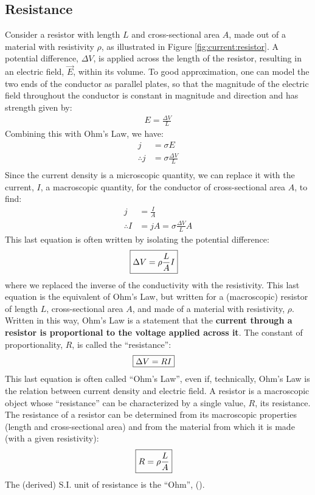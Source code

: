 \subsection{Resistance}
Consider a resistor with length $L$ and cross-sectional area $A$, made out of a material with resistivity $\rho$, as illustrated in Figure \ref{fig:current:resistor}.
A potential difference, $\Delta V$, is applied across the length of the resistor, resulting in an electric field, $\vec E$, within its volume. To good approximation, one can model the two ends of the conductor as parallel plates, so that the magnitude of the electric field throughout the conductor is constant in magnitude and direction and has strength given by:
\begin{align*}
E=\frac{\Delta V}{L}
\end{align*}
Combining this with Ohm's Law, we have:
\begin{align*}
j&=\sigma E\\
\therefore j&=\sigma\frac{\Delta V}{L}\\
\end{align*}
Since the current density is a microscopic quantity, we can replace it with the current, $I$, a macroscopic quantity, for the conductor of cross-sectional area $A$, to find:
\begin{align*}
j&=\frac{I}{A}\\
\therefore I&=jA=\sigma\frac{\Delta V}{L}A
\end{align*}
This last equation is often written by isolating the potential difference:
\begin{align*}
\Aboxed{\Delta V = \rho \frac{L}{A} I}
\end{align*}
where we replaced the inverse of the conductivity with the resistivity. This last equation is the equivalent of Ohm's Law, but written for a (macroscopic) resistor of length $L$, cross-sectional area $A$, and made of a material with resistivity, $\rho$. Written in this way, Ohm's Law is a statement that the \textbf{current through a resistor is proportional to the voltage applied across it}. The constant of proportionality, $R$, is called the ``resistance'':
\begin{align*}
\Aboxed{\Delta V = RI}
\end{align*}
This last equation is often called ``Ohm's Law'', even if, technically, Ohm's Law is the relation between current density and electric field. A resistor is a macroscopic object whose ``resistance'' can be characterized by a single value, $R$, its resistance. The resistance of a resistor can be determined from its macroscopic properties (length and cross-sectional area) and from the material from which it is made (with a given resistivity):
\begin{align*}
\Aboxed{R = \rho \frac{L}{A} }
\end{align*}
The (derived) S.I. unit of resistance is the ``Ohm'', (\si{\Omega}).


